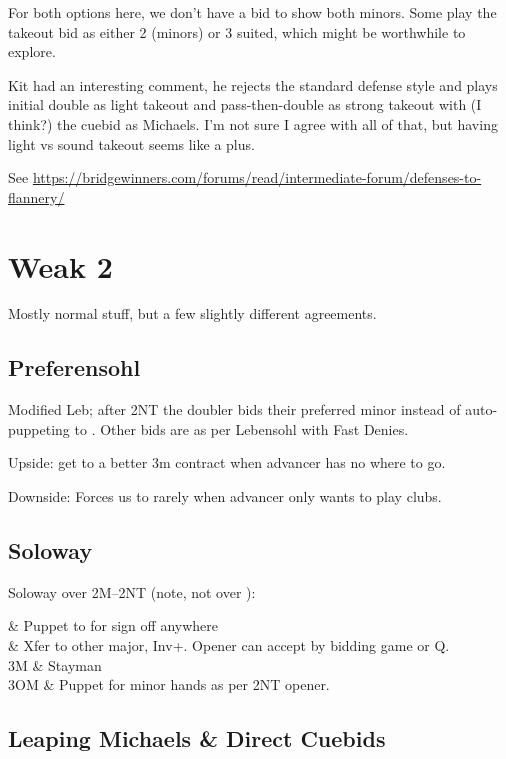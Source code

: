 \documentclass[tom-ari]{subfile}
\begin{document}
	For both options here, we don't have a bid to show both minors. Some play the  takeout bid as either 2 (minors) or 3 suited, which might be worthwhile to explore.
	
	Kit had an interesting comment, he rejects the standard defense style and plays initial double as light takeout and pass-then-double as strong takeout with (I think?) the  cuebid as Michaels. I'm not sure I agree with all of that, but having light vs sound takeout seems like a plus.
	
	See \url{https://bridgewinners.com/forums/read/intermediate-forum/defenses-to-flannery/}
	
	\section{Weak 2}
	
	Mostly normal stuff, but a few slightly different agreements.
	
	\subsection{Preferensohl}
	
	Modified Leb; after 2NT the doubler bids their preferred minor instead of auto-puppeting to . Other bids are as per Lebensohl with Fast Denies.
	
	Upside: get to a better 3m contract when advancer has no where to go.
	
	Downside: Forces us to  rarely when advancer only wants to play clubs. 
	
	\subsection{Soloway}

	Soloway over 2M--2NT (note, not over ):
	
	\begin{bidtable}{}
		 & Puppet to  for sign off anywhere \\
		 & Xfer to other major, Inv+. Opener can accept by bidding game or Q. \\
		3M & Stayman \\
		3OM & Puppet for minor hands as per 2NT opener. \\
	\end{bidtable}

	\subsection{Leaping Michaels \& Direct Cuebids}
	
\end{document}
